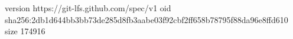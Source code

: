 version https://git-lfs.github.com/spec/v1
oid sha256:2db1d644bb3bb73de285d8fb3aabe03f92cbf2ff658b78795f88da96e8ffd610
size 174916
